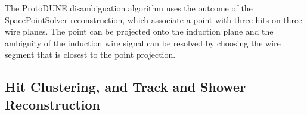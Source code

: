 The ProtoDUNE disambiguation algorithm uses the outcome of the SpacePointSolver reconstruction, which associate a \threed point with three hits on three wire planes. The \threed point can be projected onto the induction plane and the ambiguity of the induction wire signal can be resolved by choosing the wire segment that is closest to the \threed point projection. 


\subsection{Hit Clustering, and Track and Shower Reconstruction}

